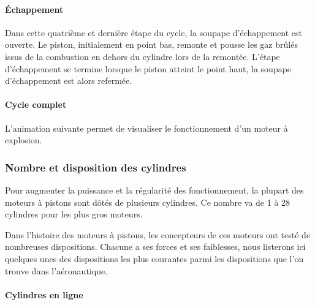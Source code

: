 		
		\paragraph{Échappement}
		
		Dans cette quatrième et dernière étape du cycle, la soupape d'échappement est ouverte. Le piston, initialement en point bas, remonte et pousse les gaz brûlés issus de la combustion en dehors du cylindre lors de la remontée. L'étape d'échappement se termine lorsque le piston atteint le point haut, la soupape d'échappement est alors refermée.
		
		\begin{figure}[H]
  		\centering
		
		\end{figure}	
		
		\paragraph{Cycle complet}
		
		L'animation suivante permet de visualiser le fonctionnement d'un moteur à explosion.	
		
		\renewcommand{\echelleTikz}{0.5}
		\begin{figure}[H]
  		\centering
		
		\end{figure}	
		
	\subsubsection{Nombre et disposition des cylindres}
	Pour augmenter la puissance et la régularité des fonctionnement, la plupart des moteurs à pistons sont dôtés de plusieurs cylindres. Ce nombre va de 1 à 28 cylindres pour les plus gros moteurs.
	
	Dans l'histoire des moteurs à pistons, les concepteurs de ces moteurs ont testé de nombreuses dispositions. Chacune a ses forces et ses faiblesses, nous listerons ici quelques unes des dispositions les plus courantes parmi les dispositions que l'on trouve dans l'aéronautique.
	
	\paragraph{Cylindres en ligne}
	
